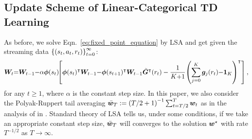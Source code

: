 \subsection{Update Scheme of Linear-Categorical TD Learning}
As before, we solve Eqn.~\eqref{eq:fixed_point_equation} by LSA and get {\LCTD} given the streaming data  $\left\{{\left({s_t,a_t,r_t}\right)}\right\}_{t=0}^\infty$:
\begin{equation}\label{eq:linear_CTD}
\begin{aligned}
{\bm{W}}_t{=}{\bm{W}}_{t{-}1}{-}\alpha{\bm{\phi}}(s_t)\!\!\left[{{\bm{\phi}}(s_t)^{\intercal}{\bm{W}}_{t{-}1}{-}{\bm{\phi}}(s_{t{+}1})^{\intercal}{\bm{W}}_{t{-}1}\tilde{{\bm{G}}}^{\intercal}(r_t)-\frac{1}{K{+}1}\!\left({\sum_{j=0}^K{\bm{g}}_j(r_t){-}\bm{1}_{K}}\right)^{\intercal}}\right],
\end{aligned}
\end{equation}
for any $t\geq 1$, where $\alpha$ is the constant step size.
In this paper, we also consider the Polyak-Ruppert tail averaging $\bar{{\bm{w}}}_{T}:=\left({T/2+1}\right)^{-1}\sum_{t=T/2}^T{\bm{w}}_t$ as in the analysis of {\LTD} in \citep{samsonov2024improved}.
Standard theory of LSA \citep{mou2020linear} tells us, under some conditions, if we take an appropriate constant step size, $\bar{{\bm{w}}}_{T}$ will converges to the solution ${\bm{w}}^\star$ with rate $T^{-1/2}$ as $T\to\infty$.
